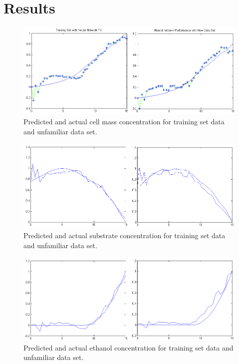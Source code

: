 \documentclass[10pt]{article}
\begin{document}
\section{Results}
\begin{figure}[h!]
\centering
\includegraphics[scale = .3]{X.png}
\caption{Predicted and actual cell mass concentration for training set data and unfamiliar data set.}
\end{figure}
\begin{figure} [h!]
\centering
\includegraphics[scale = .3]{S.png}
\caption{Predicted and actual substrate concentration for training set data and unfamiliar data set.}
\end{figure}
\begin{figure} [h!]
\centering
\includegraphics[scale = .3]{E.png}
\caption{Predicted and actual ethanol concentration for training set data and unfamiliar data set.}
\end{figure}
\end{document}
